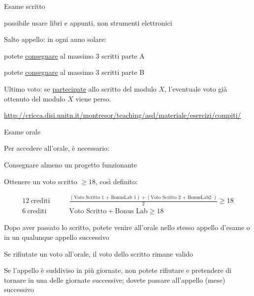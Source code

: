 \begin{frame}{Esame scritto}

\vspace{-9pt}
\begin{myboxtitle}
\BI
\item \EE possibile usare libri e appunti, non strumenti elettronici
\EI
\end{myboxtitle}

\begin{myboxtitle}[Regole]
\BI
\item \alert{Salto appello}: in ogni anno solare:
\BI
\item potete \underline{consegnare} al massimo \alert{3} scritti parte A
\item potete \underline{consegnare} al massimo \alert{3} scritti parte B
\EI
\item \alert{Ultimo voto}: se \underline{partecipate} allo scritto del modulo $X$, l'eventuale voto già ottenuto del modulo $X$ viene perso.
\EI
\end{myboxtitle}

\begin{myboxtitle}
\small
\url{http://cricca.disi.unitn.it/montresor/teaching/asd/materiale/esercizi/compiti/}
\end{myboxtitle}

\end{frame}

\begin{frame}{Esame orale}

Per accedere all'orale, è necessario:
\BIL
\item Consegnare almeno un progetto funzionante 
\item Ottenere un voto scritto ${} \geq 18$, così definito:

\begingroup
\tiny
\begin{align*}
  \mathrm{12\ crediti} & \qquad \frac{(\textrm{Voto Scritto 1 + BonusLab 1}) + (\textrm{Voto Scritto 2 + BonusLab2 })}{2} \geq 18 \\
  \mathrm{6\ crediti} & \qquad \textrm{Voto Scritto} + \textrm{Bonus Lab} \geq 18 
\end{align*}
\endgroup

\item Dopo aver passato lo scritto, potete venire all'orale nello stesso appello d'esame o in un qualunque appello successivo
\item Se rifiutate un voto all’orale, il voto dello scritto rimane valido
\item Se l'appello è suddiviso in più giornate, non potete rifiutare e pretendere di tornare in una delle giornate successive; dovete passare all'appello (mese) successivo
\EIL
\end{frame}

